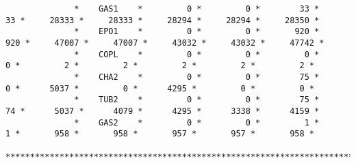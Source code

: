 \begin{center}
\begin{verbatim}
              *    GAS1    *         0 *         0 *        33 *        33 *     28333 *     28333 *     28294 *     28294 *     28350 *
              *    EPO1    *         0 *         0 *       920 *       920 *     47007 *     47007 *     43032 *     43032 *     47742 *
              *    COPL    *         0 *         0 *         0 *         0 *         2 *         2 *         2 *         2 *         2 *
              *    CHA2    *         0 *         0 *        75 *         0 *      5037 *         0 *      4295 *         0 *         0 *
              *    TUB2    *         0 *         0 *        75 *        74 *      5037 *      4079 *      4295 *      3338 *      4159 *
              *    GAS2    *         0 *         0 *         1 *         1 *       958 *       958 *       957 *       957 *       958 *
              **************************************************************************************************************************
\end{verbatim}
\end{center}
